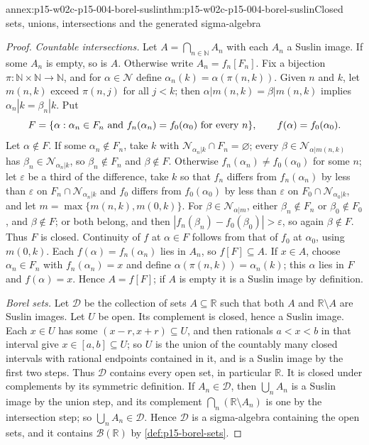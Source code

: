 \begin{annexitem}{annex:p15-w02c-p15-004-borel-suslin}{thm:p15-w02c-p15-004-borel-suslin}{Closed sets, unions, intersections and the generated sigma-algebra}
\begin{proof}
\emph{Countable intersections.} Let \(A=\bigcap_{n\in\mathbb N}A_n\) with
each \(A_n\) a Suslin image. If some \(A_n\) is empty, so is \(A\).
Otherwise write \(A_n=f_n[F_n]\). Fix a bijection
\(\pi:\mathbb N\times\mathbb N\to\mathbb N\), and for
\(\alpha\in\mathcal N\) define \(\alpha_n(k)=\alpha(\pi(n,k))\). Given
\(n\) and \(k\), let \(m(n,k)\) exceed \(\pi(n,j)\) for all \(j<k\);
then \(\alpha|m(n,k)=\beta|m(n,k)\) implies
\(\alpha_n|k=\beta_n|k\). Put
\[
 F=\{\alpha:\alpha_n\in F_n\hbox{ and }f_n(\alpha_n)=f_0(\alpha_0)
     \hbox{ for every }n\},\qquad f(\alpha)=f_0(\alpha_0).
\]
Let \(\alpha\notin F\). If some \(\alpha_n\notin F_n\), take \(k\) with
\(\mathcal N_{\alpha_n|k}\cap F_n=\varnothing\); every
\(\beta\in\mathcal N_{\alpha|m(n,k)}\) has
\(\beta_n\in\mathcal N_{\alpha_n|k}\), so \(\beta_n\notin F_n\) and
\(\beta\notin F\). Otherwise \(f_n(\alpha_n)\neq f_0(\alpha_0)\) for some
\(n\); let \(\varepsilon\) be a third of the difference, take \(k\) so that
\(f_n\) differs from \(f_n(\alpha_n)\) by less than \(\varepsilon\) on
\(F_n\cap\mathcal N_{\alpha_n|k}\) and \(f_0\) differs from
\(f_0(\alpha_0)\) by less than \(\varepsilon\) on
\(F_0\cap\mathcal N_{\alpha_0|k}\), and let
\(m=\max\{m(n,k),m(0,k)\}\). For \(\beta\in\mathcal N_{\alpha|m}\),
either \(\beta_n\notin F_n\) or \(\beta_0\notin F_0\), and
\(\beta\notin F\); or both belong, and then
\(|f_n(\beta_n)-f_0(\beta_0)|>\varepsilon\), so again \(\beta\notin F\).
Thus \(F\) is closed. Continuity of \(f\) at \(\alpha\in F\) follows from
that of \(f_0\) at \(\alpha_0\), using \(m(0,k)\). Each
\(f(\alpha)=f_n(\alpha_n)\) lies in \(A_n\), so \(f[F]\subseteq A\).
If \(x\in A\), choose \(\alpha_n\in F_n\) with \(f_n(\alpha_n)=x\) and
define \(\alpha(\pi(n,k))=\alpha_n(k)\); this \(\alpha\) lies in \(F\)
and \(f(\alpha)=x\). Hence \(A=f[F]\); if \(A\) is empty it is a Suslin
image by definition.

\emph{Borel sets.} Let \(\mathcal D\) be the collection of sets
\(A\subseteq\mathbb R\) such that both \(A\) and \(\mathbb R\setminus A\)
are Suslin images. Let \(U\) be open. Its complement is closed, hence a
Suslin image. Each \(x\in U\) has some \((x-r,x+r)\subseteq U\), and then
rationals \(a<x<b\) in that interval give \(x\in[a,b]\subseteq U\); so
\(U\) is the union of the countably many closed intervals with rational
endpoints contained in it, and is a Suslin image by the first two steps.
Thus \(\mathcal D\) contains every open set, in particular \(\mathbb R\).
It is closed under complements by its symmetric definition. If
\(A_n\in\mathcal D\), then \(\bigcup_nA_n\) is a Suslin image by the
union step, and its complement \(\bigcap_n(\mathbb R\setminus A_n)\) is
one by the intersection step; so \(\bigcup_nA_n\in\mathcal D\). Hence
\(\mathcal D\) is a sigma-algebra containing the open sets, and it
contains \(\mathcal B(\mathbb R)\) by \cref{def:p15-borel-sets}.
\end{proof}
\end{annexitem}

